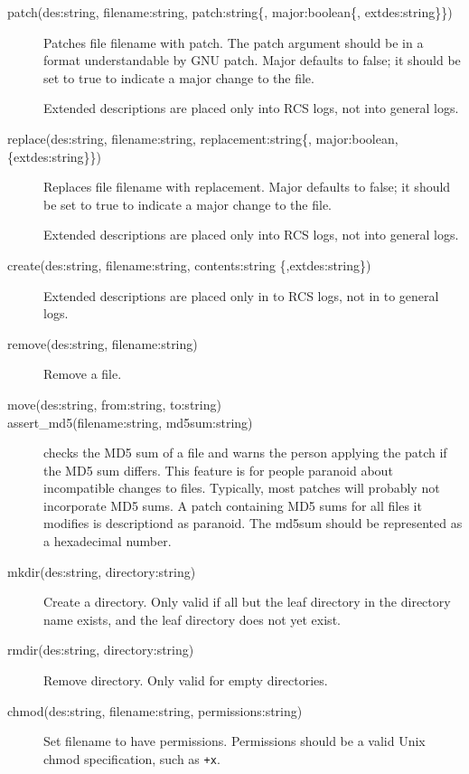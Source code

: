 \documentclass{article}
\begin{document}
\begin{description}


\item[patch(des:string, filename:string, patch:string\{,
major:boolean\{, extdes:string\}\})]

Patches file filename with patch. The patch argument should be in a
format understandable by GNU patch. Major defaults to false; it should
be set to true to indicate a major change to the file.

Extended descriptions are placed only into RCS logs, not into
general logs.


\item[replace(des:string, filename:string,
replacement:string\{, major:boolean, \{extdes:string\}\})]

Replaces file filename with replacement. Major defaults to false; it
should be set to true to indicate a major change to the file.

Extended descriptions are placed only into RCS logs, not into
general logs.


\item[create(des:string, filename:string, contents:string \{,extdes:string\})]

Extended descriptions are placed only in to RCS logs, not in to
general logs.

\item[remove(des:string, filename:string)]

Remove a file. 

\item[move(des:string, from:string, to:string)]

\item[assert\_md5(filename:string, md5sum:string)]
checks the MD5 sum of a file and warns the person applying the patch
if the MD5 sum differs. This feature is for people paranoid about
incompatible changes to files. Typically, most patches will probably
not incorporate MD5 sums. A patch containing MD5 sums for all files it
modifies is descriptiond as paranoid. The md5sum should be represented
as a hexadecimal number.

\item[mkdir(des:string, directory:string)]

Create a directory. Only valid if all but the leaf directory in the
directory name exists, and the leaf directory does not yet exist.

\item[rmdir(des:string, directory:string)]

Remove directory. Only valid for empty directories.

\item[chmod(des:string, filename:string, permissions:string)]

Set filename to have permissions. Permissions should be a valid Unix
chmod specification, such as \texttt{+x}.

\end{description}
\end{document}
